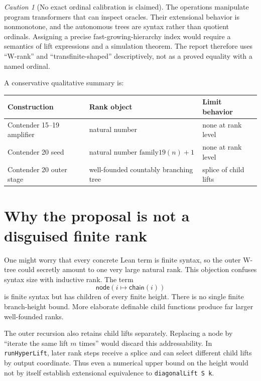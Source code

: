 \documentclass[11pt]{article}
\theoremstyle{definition}
\theoremstyle{remark}
\newtheorem{caution}[theorem]{Caution}
\newcommand{\code}[1]{\texttt{#1}}
\begin{document}
\begin{caution}[No exact ordinal calibration is claimed]
The operations manipulate program transformers that can inspect oracles.
Their extensional behavior is nonmonotone, and the autonomous trees are syntax
rather than quotient ordinals.  Assigning a precise fast-growing-hierarchy
index would require a semantics of lift expressions and a simulation theorem.
The report therefore uses ``W-rank'' and ``transfinite-shaped'' descriptively,
not as a proved equality with a named ordinal.
\end{caution}

A conservative qualitative summary is:
\begin{center}
\begin{tabular}{lll}
\toprule
Construction & Rank object & Limit behavior\\
\midrule
Contender 15--19 amplifier & natural number & none at rank level\\
Contender 20 seed & natural number \(\mathrm{family19}(n)+1\) & none at rank level\\
Contender 20 outer stage & well-founded countably branching tree & splice of child lifts\\
\bottomrule
\end{tabular}
\end{center}

\section{Why the proposal is not a disguised finite rank}

One might worry that every concrete Lean term is finite syntax, so the outer
W-tree could secretly amount to one very large natural rank.  This objection
confuses syntax size with inductive rank.  The term
\[
\mathsf{node}(i\mapsto\mathsf{chain}(i))
\]
is finite syntax but has children of every finite height.  There is no single
finite branch-height bound.  More elaborate definable child functions produce
far larger well-founded ranks.

The outer recursion also retains child lifts separately.  Replacing a node by
``iterate the same lift \(m\) times'' would discard this addressability.  In
\code{runHyperLift}, later rank steps receive a splice and can select different
child lifts by output coordinate.  Thus even a numerical upper bound on the
height would not by itself establish extensional equivalence to
\code{diagonalLift S k}.
\end{document}
